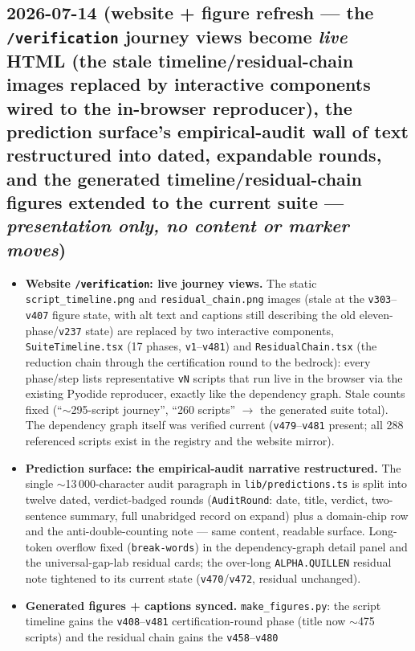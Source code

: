 \documentclass[11pt]{article}
\begin{document}
\subsection*{2026-07-14 (website + figure refresh --- the \texttt{/verification} journey views become \emph{live} HTML (the stale timeline/residual-chain images replaced by interactive components wired to the in-browser reproducer), the prediction surface's empirical-audit wall of text restructured into dated, expandable rounds, and the generated timeline/residual-chain figures extended to the current suite --- \emph{presentation only, no content or marker moves})}
\begin{itemize}[leftmargin=1.5em]
\item \textbf{Website \texttt{/verification}: live journey views.} The static
\texttt{script\_timeline.png} and \texttt{residual\_chain.png} images (stale at the
\texttt{v303}--\texttt{v407} figure state, with alt text and captions still describing the
old eleven-phase/\texttt{v237} state) are replaced by two interactive components,
\texttt{SuiteTimeline.tsx} (17 phases, \texttt{v1}--\texttt{v481}) and
\texttt{ResidualChain.tsx} (the reduction chain through the certification round to the
bedrock): every phase/step lists representative \texttt{vN} scripts that run live in the
browser via the existing Pyodide reproducer, exactly like the dependency graph. Stale counts
fixed (``$\sim$295-script journey'', ``260 scripts'' $\to$ the generated suite total). The
dependency graph itself was verified current (\texttt{v479}--\texttt{v481} present; all 288
referenced scripts exist in the registry and the website mirror).
\item \textbf{Prediction surface: the empirical-audit narrative restructured.} The single
$\sim$13\,000-character audit paragraph in \texttt{lib/predictions.ts} is split into twelve
dated, verdict-badged rounds (\texttt{AuditRound}: date, title, verdict, two-sentence summary,
full unabridged record on expand) plus a domain-chip row and the anti-double-counting note ---
same content, readable surface. Long-token overflow fixed (\texttt{break-words}) in the
dependency-graph detail panel and the universal-gap-lab residual cards; the over-long
\texttt{ALPHA.QUILLEN} residual note tightened to its current state
(\texttt{v470}/\texttt{v472}, residual unchanged).
\item \textbf{Generated figures + captions synced.} \texttt{make\_figures.py}: the script
timeline gains the \texttt{v408}--\texttt{v481} certification-round phase (title now
$\sim$475 scripts) and the residual chain gains the \texttt{v458}--\texttt{v480}

\end{itemize}
\end{document}
